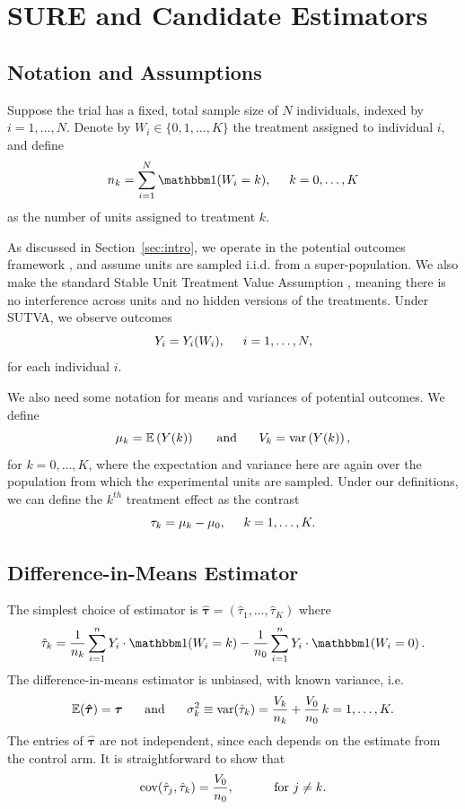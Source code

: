 \documentclass{article}
\newcommand{\I}{\mathbbm 1}
\newcommand{\bstau}{\boldsymbol \tau}
\newcommand{\hbstau}{\boldsymbol{\hat \tau}}
\def\E{\mathbb{E}}
\def\var{\text{var}}
\def\cov{\text{cov}}
\begin{document}
\section{SURE and Candidate Estimators}\label{sec:theory}
\subsection{Notation and Assumptions}

Suppose the trial has a fixed, total sample size of $N$ individuals, indexed by $i = 1, \dots, N$. 
Denote by $W_i \in \{0, 1, \dots, K\}$ the treatment assigned to individual $i$, and define
\[ n_k = \sum_{i = 1}^N \I(W_i = k), \hspace{5mm} k = 0, \dots, K \] 
as the number of units assigned to treatment $k$. 

As discussed in Section~\ref{sec:intro}, we operate in the potential outcomes framework \citep{rubin1974estimating}, and assume units are sampled i.i.d. from a super-population. We also make the standard Stable Unit Treatment Value Assumption \citep[SUTVA;][]{rubin1980randomization}, meaning there is no interference across units and no hidden versions of the treatments. Under SUTVA, we observe outcomes 
\[
Y_i = Y_i(W_i), \hspace{5mm} i = 1, \dots, N,
\]
for each individual $i$.

We also need some notation for means and variances of potential outcomes. We define
\[ \mu_k = \E \left( Y(k) \right) \hspace{5mm} \text{ and } \hspace{5mm} V_k = \var \left( Y(k) \right), \] 
for $k = 0, \dots, K$, where the expectation and variance here are again over the population from which the experimental units are sampled. Under our definitions, we can define the $k^{th}$ treatment effect as the contrast
\[ \tau_k = \mu_k - \mu_0, \hspace{5mm} k = 1, \dots, K.\]


\subsection{Difference-in-Means Estimator}

The simplest choice of estimator is $\hbstau = \left( \hat \tau_1, \dots, \hat \tau_K \right)$ where 
\[ \hat \tau_k = \frac{1}{n_k} \sum_{i = 1}^n Y_i \cdot \I(W_i = k) - \frac{1}{n_0} \sum_{i = 1}^n Y_i \cdot \I(W_i = 0) \,.\] 
The difference-in-means estimator is unbiased, with known variance, i.e. 
\[ \E (\hbstau)  = \bstau \hspace{5mm} \text{ and } \hspace{5mm}\sigma_k^2 \equiv \var(\hat \tau_k) = \frac{V_k}{n_k} + \frac{V_0}{n_0}\, k = 1, \dots, K. \] 
The entries of $\hbstau$ are not independent, since each depends on the estimate from the control arm. It is straightforward to show that 
\[ \cov(\hat \tau_j, \hat \tau_k) = \frac{V_0}{n_0}, \hspace{10mm} \text{ for } j \neq k.\]
\end{document}
